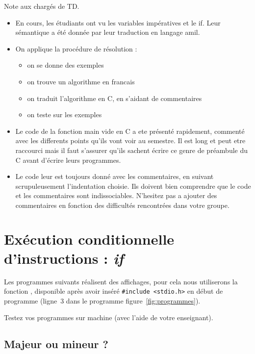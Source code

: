 \begin{correction}
  Note aux chargés de TD.
  \begin{itemize}
  \item En cours, les étudiants ont vu les variables impératives et
    le if. Leur sémantique a été donnée par leur traduction en langage
    amil.
  \item On applique la procédure de résolution :
    \begin{itemize}
    \item on se donne des exemples
    \item on trouve un algorithme en francais
    \item on traduit l'algorithme en C, en s'aidant de commentaires
    \item on teste sur les exemples 
    \end{itemize}
  \item Le code de la fonction main vide en C a ete présenté rapidement, commenté avec les differents points qu'ils vont voir au semestre. Il est long et peut etre raccourci mais il faut s'assurer qu'ils sachent écrire ce genre de préambule du C avant d'écrire leurs programmes.
  \item Le code leur est toujours donné avec les commentaires, en suivant scrupuleusement l'indentation choisie. Ils doivent bien comprendre que le code et les commentaires sont indissociables. N'hesitez pas a ajouter des commentaires en fonction des difficultés rencontrées dans votre groupe.
  \end{itemize}
\end{correction}


\section{Exécution conditionnelle d'instructions :  \emph{if}}
Les programmes suivants réalisent des affichages, pour cela nous
utiliserons la fonction , disponible après avoir inséré
\verb|#include <stdio.h>| en début de programme (ligne~3 dans le
programme figure~\ref{fig:programmes}). 

Testez vos programmes sur
machine (avec l'aide de votre enseignant).

\subsection{Majeur ou mineur ?}

